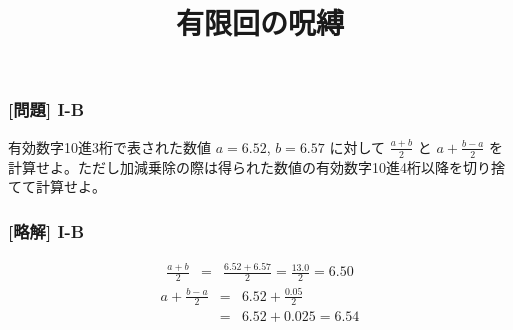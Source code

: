 \documentclass[dvipdfmx,aspectratio=169,20pt]{beamer}
\begin{document}
\begin{frame}
\frametitle{[問題] I-B}
有効数字10進3桁で表された数値 $a=6.52$, $b=6.57$ に対して $\frac{a+b}{2}$ と $a+\frac{b-a}{2}$ を計算せよ。ただし加減乗除の際は得られた数値の有効数字10進4桁以降を切り捨てて計算せよ。
\end{frame}

\begin{frame}
\frametitle{[略解] I-B}
\vspace{-1cm}
\begin{eqnarray*}
    \frac{a+b}{2}
    &=&\frac{6.52+6.57}{2}=\frac{13.0}{2}=6.50
\end{eqnarray*}
\begin{eqnarray*}
    a+\frac{b-a}{2}
    &=&6.52+\frac{0.05}{2}\\
    &=&6.52+0.025=6.54
\end{eqnarray*}
\end{frame}

\title{有限回の呪縛}

\end{document}
